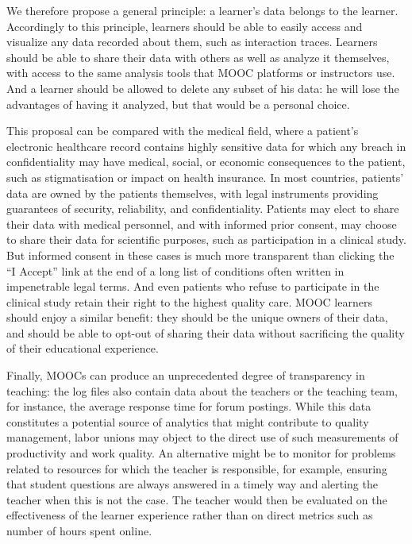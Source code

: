 We therefore
propose a general principle: a learner's data belongs to the
learner.  Accordingly to this principle,  learners should be able to
easily access and visualize any data recorded about them, 
such as
interaction traces.
Learners should be able to share their data with others as well as
analyze it themselves, with access to the same analysis tools that MOOC
platforms or instructors use.
And a learner should be allowed to delete any
subset
of his data: he will lose the advantages
of having it analyzed, but that would be a personal choice.

This proposal can be compared with the medical field, where a patient's
electronic healthcare record contains highly sensitive data for which any
breach in confidentiality may have medical, social, or economic
consequences to the patient,
such as stigmatisation or impact on health insurance. 
In most countries, patients' data are owned by the
patients themselves, with legal instruments providing guarantees of
security, reliability, and confidentiality. Patients may elect to share
their data with  medical personnel, and with informed prior consent, may
choose to share their data for scientific purposes,
such as participation in a clinical study. But informed consent in these
cases is much more transparent than clicking the ``I Accept'' link at
the end of a long list of conditions often written in impenetrable legal
terms. 
And even patients who refuse to participate in the
clinical study retain their right to the highest quality care.
MOOC learners should enjoy a similar benefit: they
should be the unique owners of their data, and should be able to
opt-out of sharing their data without sacrificing the quality
of their educational experience.

Finally, MOOCs can
produce an unprecedented degree of transparency in teaching:  the log
files also contain data about the teachers or the 
teaching team, for instance, the average response time for forum
postings.  While this data constitutes a potential source of
analytics that might contribute to quality management,
labor unions may object to the direct use of such
measurements of productivity and work quality. An alternative might be
to monitor for problems related to resources for which the teacher is
responsible, for example, ensuring that student questions are always
answered in a timely way and 
alerting the teacher when this is not the case.  The teacher would then
be evaluated on the effectiveness of the learner experience rather than on
direct metrics such as number of hours spent online.

